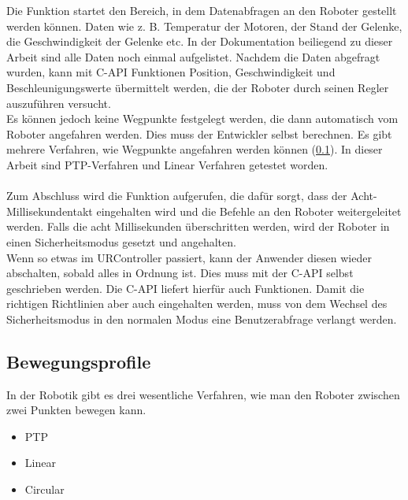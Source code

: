 Die Funktion  startet den Bereich, in dem Datenabfragen an den Roboter gestellt werden können. Daten wie z. B. Temperatur der Motoren, der Stand der Gelenke, die Geschwindigkeit der Gelenke etc. In der Dokumentation beiliegend zu dieser Arbeit sind alle Daten noch einmal aufgelistet. Nachdem die Daten abgefragt wurden, kann mit C-API Funktionen Position, Geschwindigkeit und Beschleunigungswerte übermittelt werden, die der Roboter durch seinen Regler auszuführen versucht.\\
Es können jedoch keine Wegpunkte festgelegt werden, die dann automatisch vom Roboter angefahren werden. Dies muss der Entwickler selbst 
berechnen. 
Es gibt mehrere Verfahren, wie Wegpunkte angefahren werden können (\ref{sub:bewegungsprofile_gru}). In dieser Arbeit sind \ac{PTP}-Verfahren und Linear Verfahren getestet worden.
\\\\
Zum Abschluss wird die Funktion  aufgerufen, die dafür sorgt, dass der Acht-Millisekundentakt eingehalten wird und die Befehle an den Roboter weitergeleitet werden. Falls die acht Millisekunden überschritten werden, wird der Roboter in einen Sicherheitsmodus gesetzt und angehalten.
\\
Wenn so etwas im URController passiert, kann der Anwender diesen wieder abschalten, sobald alles in Ordnung ist. Dies muss mit der C-API selbst geschrieben werden. Die C-API liefert hierfür auch Funktionen. Damit die richtigen Richtlinien aber auch eingehalten werden, muss von dem Wechsel des Sicherheitsmodus in den normalen Modus eine Benutzerabfrage verlangt werden.

\subsection{Bewegungsprofile}
\label{sub:bewegungsprofile_gru}

In der Robotik gibt es drei wesentliche Verfahren, wie man den Roboter zwischen zwei Punkten bewegen kann. 

\begin{itemize}
\item \ac{PTP}
\item Linear
\item Circular
\end{itemize}

